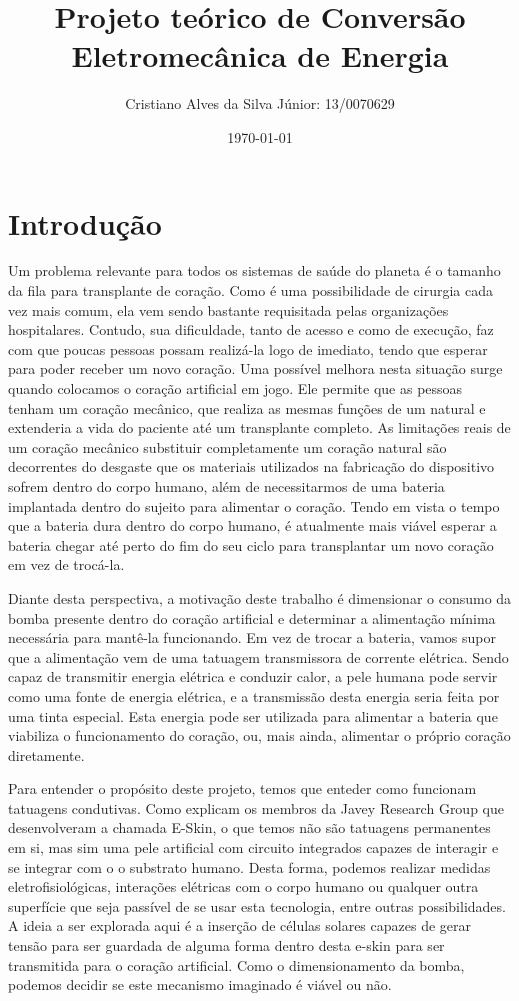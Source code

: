\documentclass[12pt, a4paper, twoside]{article}
\begin{document}
\title{Projeto teórico de Conversão Eletromecânica de Energia}
\author{Cristiano Alves da Silva Júnior: 13/0070629}
\date{\today}
\maketitle

\section{Introdução}

Um problema relevante para todos os sistemas de saúde do planeta é o tamanho da fila para transplante de coração. Como é uma possibilidade de cirurgia cada vez mais comum, ela vem sendo bastante requisitada pelas organizações hospitalares. Contudo, sua dificuldade, tanto de acesso e como de execução, faz com que poucas pessoas possam realizá-la logo de imediato, tendo que esperar para poder receber um novo coração. Uma possível melhora nesta situação surge quando colocamos o coração artificial em jogo. Ele permite que as pessoas tenham um coração mecânico, que realiza as mesmas funções de um natural e extenderia a vida do paciente até um transplante completo. As limitações reais de um coração mecânico substituir completamente um coração natural são decorrentes do desgaste que os materiais utilizados na fabricação do dispositivo sofrem dentro do corpo humano, além de necessitarmos de uma bateria implantada dentro do sujeito para alimentar o coração. Tendo em vista o tempo que a bateria dura dentro do corpo humano, é atualmente mais viável esperar a bateria chegar até perto do fim do seu ciclo para transplantar um novo coração em vez de trocá-la.

Diante desta perspectiva, a motivação deste trabalho é dimensionar o consumo da bomba presente dentro do coração artificial e determinar a alimentação mínima necessária para mantê-la funcionando. Em vez de trocar a bateria, vamos supor que a alimentação vem de uma tatuagem transmissora de corrente elétrica. Sendo capaz de transmitir energia elétrica e conduzir calor, a pele humana pode servir como uma fonte de energia elétrica, e a transmissão desta energia seria feita por uma tinta especial. Esta energia pode ser utilizada para alimentar a bateria que viabiliza o funcionamento do coração, ou, mais ainda, alimentar o próprio coração diretamente.

Para entender o propósito deste projeto, temos que enteder como funcionam tatuagens condutivas. Como explicam os membros da Javey Research Group que desenvolveram a chamada E-Skin, o que temos não são tatuagens permanentes em si, mas sim uma pele artificial com circuito integrados capazes de interagir e se integrar com o o substrato humano. Desta forma, podemos realizar medidas eletrofisiológicas, interações elétricas com o corpo humano ou qualquer outra superfície que seja passível de se usar esta tecnologia, entre outras possibilidades. A ideia a ser explorada aqui é a inserção de células solares capazes de gerar tensão para ser guardada de alguma forma dentro desta e-skin para ser transmitida para o coração artificial. Como o dimensionamento da bomba, podemos decidir se este mecanismo imaginado é viável ou não.
\end{document}
